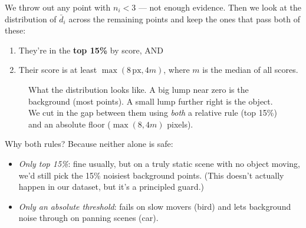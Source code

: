 \documentclass[11pt,a4paper]{article}
\begin{document}
We throw out any point with $n_i < 3$ --- not enough evidence. Then
we look at the distribution of $\bar d_i$ across the remaining
points and keep the ones that pass both of these:

\begin{enumerate}\itemsep2pt
\item They're in the \textbf{top 15\%} by score, AND
\item Their score is at least $\max(8\,\text{px}, 4m)$, where $m$ is
  the median of all scores.
\end{enumerate}

\begin{figure}[H]
\centering
{}
\caption{What the distribution looks like. A big lump near zero is
the background (most points). A small lump further right is the
object. We cut in the gap between them using \emph{both} a relative
rule (top 15\%) and an absolute floor ($\max(8, 4m)$ pixels).}
\end{figure}

Why both rules? Because neither alone is safe:

\begin{itemize}\itemsep2pt
\item \emph{Only top 15\%}: fine usually, but on a truly static
  scene with no object moving, we'd still pick the 15\% noisiest
  background points. (This doesn't actually happen in our dataset,
  but it's a principled guard.)
\item \emph{Only an absolute threshold}: fails on slow movers (bird)
  and lets background noise through on panning scenes (car).
\end{itemize}
\end{document}
